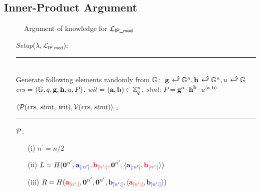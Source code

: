 \subsection{Inner-Product Argument}
\label{subsec:iipa/ipa}

\begin{figure}[h!]
    \caption{Argument of knowledge for $\L_{\textsf{IP\_mod}}$}
    \label{fig:algo1}
\end{figure}
\begin{mdframed}[skipabove=\topsep]
    \begin{itemize}[itemsep=4pt]
        \item[] \textsl{Setup}($\lambda, \mathcal{L}_{\textsf{IP\_mod}}$):
        \\[-5pt]\rule{\textwidth}{0.4pt}\\ 
        Generate following elements randomly from $\G$: $\ \textbf{g} \rgen \G^{n}, \textbf{h} \rgen \G^n, u \rgen \G$
        \\[2pt]
        \textsl{crs} = $(\G, q, \textbf{g}, \textbf{h}, u, P)$, \textsl{wit} = $(\textbf{a}, \textbf{b}) \in \Z_q^n$, \textsl{stmt}: $P = \textbf{g}^\textbf{a} \cdot \textbf{h}^\textbf{b} \cdot u^{\langle \textbf{a},\textbf{b} \rangle}$
        \vspace{2pt}
    
        \item[] $\langle \mathcal{P}(\textsl{crs, stmt, wit}), \mathcal{V}(\textsl{crs, stmt}) \rangle$ :
        \\[-5pt]\rule{\textwidth}{0.4pt}
    
        \vspace{-4pt}
        \item[] $\P$:\vspace{-4pt}
        \begin{enumerate}[itemsep=5pt]
            \item[(i)] $n^{\prime} = n/2$ 
            
            \item[(ii)] $L = H(\textbf{0}^{n^{\prime}}, 
            \textcolor{blue}{\textbf{a}_{[:n^{\prime}]}},
            \textcolor{red}{\textbf{b}_{[n^{\prime}:]}},
            \textbf{0}^{n^{\prime}},
            \langle \textcolor{blue}{\textbf{a}_{[:n^{\prime}]}},
            \textcolor{red}{\textbf{b}_{[n^{\prime}:]}}
            \rangle)$

            \item[(iii)] $R = H(\textcolor{red}{\textbf{a}_{[n^{\prime}:]}},
            \textbf{0}^{n^{\prime}}, 
            \textbf{0}^{n^{\prime}},
            \textcolor{blue}{\textbf{b}_{[n^{\prime}:]}},
            \langle \textcolor{red}{\textbf{a}_{[n^{\prime}:]}},
            \textcolor{blue}{\textbf{b}_{[n^{\prime}:]}}
            \rangle)$
        \end{enumerate}
      

\end{itemize}
\end{mdframed}
